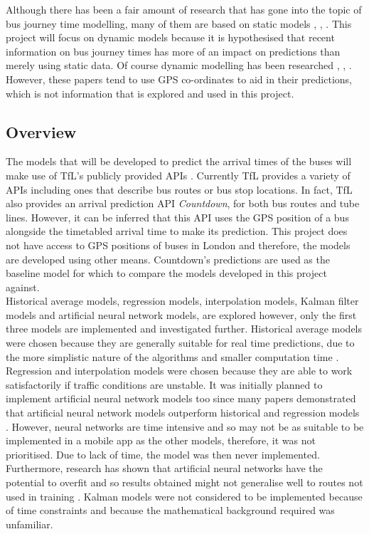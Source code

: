 Although there has been a fair amount of research that has gone into the topic of bus journey time modelling, many of them are based on static models \cite{ann-prediction}, \cite{weather-transport-effect}, \cite{google-machine-learning}. This project will focus on dynamic models because it is hypothesised that recent information on bus journey times has more of an impact on predictions than merely using static data. Of course dynamic modelling has been researched \cite{traffic-modelling-article}, \cite{dynamic-gps}, \cite{smart-public-transport}. However, these papers tend to use GPS co-ordinates to aid in their predictions, which is not information that is explored and used in this project.

\subsection{Overview}
\label{section:introduction-overview}

The models that will be developed to predict the arrival times of the buses will make use of TfL's publicly provided APIs \cite{tfl-api}. Currently TfL provides a variety of APIs including ones that describe bus routes or bus stop locations. In fact, TfL also provides an arrival prediction API \textit{Countdown}, for both bus routes and tube lines. However, it can be inferred that this API uses the GPS position of a bus alongside the timetabled arrival time to make its prediction. This project does not have access to GPS positions of buses in London and therefore, the models are developed using other means. Countdown's predictions are used as the baseline model for which to compare the models developed in this project against. \\

Historical average models, regression models, interpolation models, Kalman filter models and artificial neural network models, are explored however, only the first three models are implemented and investigated further. Historical average models were chosen because they are generally suitable for real time predictions, due to the more simplistic nature of the algorithms and smaller computation time \cite{dynamic-gps}. Regression and interpolation models were chosen because they are able to work satisfactorily if traffic conditions are unstable. It was initially planned to implement artificial neural network models too since many papers demonstrated that artificial neural network models outperform historical and regression models \cite{ann-prediction}. However, neural networks are time intensive and so may not be as suitable to be implemented in a mobile app as the other models, therefore, it was not prioritised. Due to lack of time, the model was then never implemented. Furthermore, research has shown that artificial neural networks have the potential to overfit and so results obtained might not generalise well to routes not used in training \cite{dynamic-gps}. Kalman models were not considered to be implemented because of time constraints and because the mathematical background required was unfamiliar. \\

